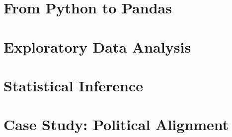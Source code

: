 \documentclass{book}
\begin{document}
\frontmatter





\mainmatter


\part{From Python to Pandas}





%

%

%

%


\part{Exploratory Data Analysis}

%

%

%

%


\part{Statistical Inference}

%

%

%


\part{Case Study: Political Alignment}

%

%



%

%



%


\end{document}
